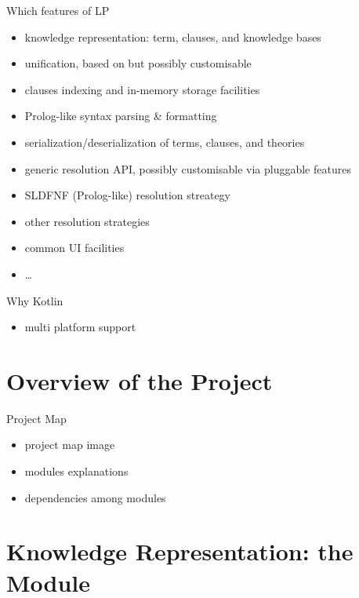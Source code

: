 \documentclass[presentation]{beamer}
\begin{document}
\begin{frame}{Which features of LP}
    \begin{itemize}
        \item knowledge representation: term, clauses, and knowledge bases
        \item unification, based on \cite{MartelliMontanari1982} but possibly customisable
        \item clauses indexing and in-memory storage facilities
        \item Prolog-like syntax parsing \& formatting
        \item serialization/deserialization of terms, clauses, and theories
        \item generic resolution API, possibly customisable via pluggable features
        \item SLDFNF (Prolog-like) resolution streategy
        \item other resolution strategies
        \item common UI facilities
        \item \ldots
    \end{itemize}
\end{frame}

\begin{frame}{Why Kotlin}
    \begin{itemize}
        \item multi platform support
    \end{itemize}
\end{frame}


\section{Overview of the Project}

\begin{frame}{Project Map}
    \begin{itemize}
        \item project map image
        \item modules explanations
        \item dependencies among modules
    \end{itemize}
\end{frame}

\section{Knowledge Representation: the  Module}
\end{document}
